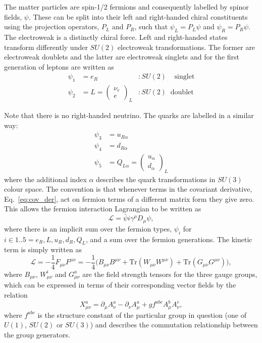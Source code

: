 The matter particles are spin-1/2 fermions and consequently labelled by spinor fields, $\psi$. These can be split into their left and right-handed chiral constituents using the projection operators, $P_{L}$ and $P_{R}$, such that $\psi_{L}=P_{L}\psi$ and $\psi_{R}=P_{R}\psi$.
The electroweak is a distinctly chiral force. Left and right-handed states transform differently under $SU(2)$ electroweak transformations. The former are electroweak doublets and the latter are electroweak singlets and for the first generation of leptons are written as
\begin{align}
  \psi_{1} & = e_{R} &:SU(2)\;\;\;\;\mathrm{singlet} \\
  \psi_{2} & = L = \begin{pmatrix} \nu_{e} \\[-0.05cm] e \end{pmatrix}_{L} &:SU(2)\;\;\mathrm{doublet}
\end{align}

Note that there is no right-handed neutrino. The quarks are labelled in a similar way:
\begin{align}
  \psi_{3} & = u_{R\alpha} \\
  \psi_{4} & = d_{R\alpha} \\
  \psi_{5} & = Q_{L\alpha} = \begin{pmatrix} u_{\alpha} \\[-0.05cm] d_{\alpha} \end{pmatrix}_{L}
\end{align}
where the additional index $\alpha$ describes the quark transformations in $SU(3)$ colour space. The convention is that whenever terms in the covariant derivative, Eq.~\ref{eq:cov_der}, act on fermion terms of a different matrix form they give zero. This allows the \SM fermion interaction Lagrangian to be written as
\begin{equation}
  \mathcal{L} = \bar{\psi}i\gamma^{\mu}D_{\mu}\psi,
\end{equation}
where there is an implicit sum over the fermion types, $\psi_{i}$ for $i\in{1..5}=e_{R}, L, u_{R}, d_{R}, Q_{L}$, and a sum over the fermion generations. The kinetic term is simply written as
\begin{equation}
  \mathcal{L} = -\frac{1}{4}F_{\mu\nu}F^{\mu\nu} = -\frac{1}{4}\biggl( B_{\mu\nu}B^{\mu\nu} + \mathrm{Tr} (W_{\mu\nu}W^{\mu\nu}) + \mathrm{Tr} (G_{\mu\nu}G^{\mu\nu}) \biggr),
\end{equation}
where $B_{\mu\nu}$, $W_{\mu\nu}^{i}$ and $G_{\mu\nu}^{a}$ are the field strength tensors for the three \SM gauge groups, which can be expressed in terms of their corresponding vector fields by the relation
\begin{equation}
X^{a}_{\mu\nu} = \partial_{\mu}A^{a}_{\nu}-\partial_{\nu}A^{a}_{\mu}+gf^{abc}A^{b}_{\mu}A^{c}_{\nu},
\end{equation}
where $f^{abc}$ is the structure constant of the particular group in question (one of $U(1)$, $SU(2)$ or $SU(3)$) and describes the commutation relationship between the group generators. %

